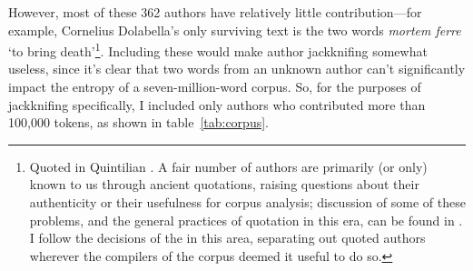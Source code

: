\documentclass[12pt,twoside]{article}
\begin{document}
However, most of these 362 authors have relatively little contribution---for example, Cornelius Dolabella's only surviving text is the two words \emph{mortem ferre} `to bring death'\footnote{Quoted in Quintilian \citep[VIII.2.4]{quintilian}. A fair number of authors are primarily (or only) known to us through ancient quotations, raising questions about their authenticity or their usefulness for corpus analysis; discussion of some of these problems, and the general practices of quotation in this era, can be found in \citet{vandenhoek}. I follow the decisions of the \citeauthor{phi} in this area, separating out quoted authors wherever the compilers of the corpus deemed it useful to do so.}. Including these would make author jackknifing somewhat useless, since it's clear that two words from an unknown author can't significantly impact the entropy of a seven-million-word corpus. So, for the purposes of jackknifing specifically, I included only authors who contributed more than 100,000 tokens, as shown in table~\ref{tab:corpus}.
\end{document}
